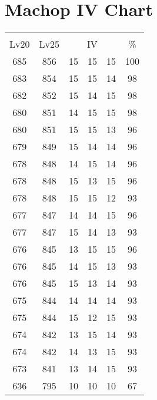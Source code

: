 \documentclass{article}%
\begin{document}
%
\normalsize%
\section{Machop IV Chart}%
\label{sec:Machop IV Chart}%
\renewcommand{\arraystretch}{1.5}%
\begin{tabular}{|c|c|c|c|c|c|}%
\hline%
\multicolumn{6}{|c|}{\textcolor{white}{ 
\linebreak{Machop}
}%
\cellcolor{black}}\\%
\multicolumn{1}{|c}{Lv20}&\multicolumn{1}{c|}{Lv25}&\multicolumn{3}{c|}{IV}&\multicolumn{1}{|c|}{\%}\\%
\hline%
\rowcolor{color100}%
685&856&15&15&15&100\\%
\hline%
\rowcolor{color98}%
683&854&15&15&14&98\\%
\hline%
\rowcolor{color98}%
682&852&15&14&15&98\\%
\hline%
\rowcolor{color98}%
680&851&14&15&15&98\\%
\hline%
\rowcolor{color96}%
680&851&15&15&13&96\\%
\hline%
\rowcolor{color96}%
679&849&15&14&14&96\\%
\hline%
\rowcolor{color96}%
678&848&14&15&14&96\\%
\hline%
\rowcolor{color96}%
678&848&15&13&15&96\\%
\hline%
\rowcolor{color93}%
678&848&15&15&12&93\\%
\hline%
\rowcolor{color96}%
677&847&14&14&15&96\\%
\hline%
\rowcolor{color93}%
677&847&15&14&13&93\\%
\hline%
\rowcolor{color96}%
676&845&13&15&15&96\\%
\hline%
\rowcolor{color93}%
676&845&14&15&13&93\\%
\hline%
\rowcolor{color93}%
676&845&15&13&14&93\\%
\hline%
\rowcolor{color93}%
675&844&14&14&14&93\\%
\hline%
\rowcolor{color93}%
675&844&15&12&15&93\\%
\hline%
\rowcolor{color93}%
674&842&13&15&14&93\\%
\hline%
\rowcolor{color93}%
674&842&14&13&15&93\\%
\hline%
\rowcolor{color93}%
673&841&13&14&15&93\\%
\hline%
\rowcolor{color91}%
636&795&10&10&10&67\\%
\end{tabular}

%
\end{document}
